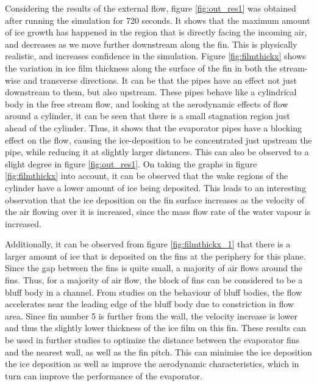 \documentclass[11pt,a4paper,twoside,oneside]{article}
\begin{document}
Considering the results of the external flow, figure \ref{fig:out_res1} was obtained after running the simulation for 720 seconds. It shows that the maximum amount of ice growth has happened in the region that is directly facing the incoming air, and decreases as we move further downstream along the fin. This is physically realistic, and increases confidence in the simulation. Figure \ref{fig:filmthickx} shows the variation in ice film thickness along the surface of the fin in both the stream-wise and transverse directions. It can be that the pipes have an effect not just downstream to them, but also upstream. These pipes behave like a cylindrical body in the free stream flow, and looking at the aerodynamic effects of flow around a cylinder\cite{ketticylinder}, it can be seen that there is a small stagnation region just ahead of the cylinder. Thus, it shows that the evaporator pipes have a blocking effect on the flow\cite{longblocker}, causing the ice-deposition to be concentrated just upstream the pipe, while reducing it at slightly larger distances. This can also be observed to a slight degree in figure \ref{fig:out_res1}. On taking the graphs in figure \ref{fig:filmthickx} into account, it can be observed that the wake regions of the cylinder have a lower amount of ice being deposited. This leads to an interesting observation that the ice deposition on the fin surface increases as the velocity of the air flowing over it is increased, since the mass flow rate of the water vapour is increased.

Additionally, it can be observed from figure \ref{fig:filmthickx_1} that there is a larger amount of ice that is deposited on the fins at the periphery for this plane. Since the gap between the fins is quite small, a majority of air flows around the fins. Thus, for a majority of air flow, the block of fins can be considered to be a bluff body in a channel. From studies on the behaviour of bluff bodies\cite{bluffbody1}\cite{bluffbody2}, the flow accelerates near the leading edge of the bluff body due to constriction in flow area. Since fin number 5 is further from the wall, the velocity increase is lower and thus the slightly lower thickness of the ice film on this fin. These results can be used in further studies to optimize the distance between the evaporator fins and the nearest wall, as well as the fin pitch. This can minimise the ice deposition the ice deposition as well as improve the aerodynamic characteristics, which in turn can improve the performance of the evaporator.
\end{document}
